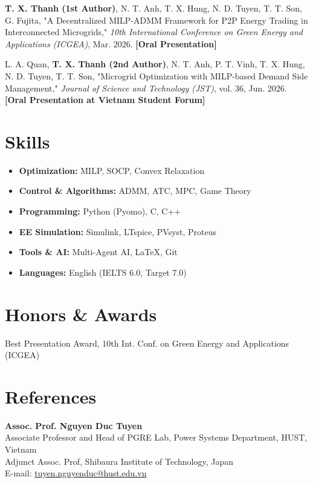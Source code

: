 \documentclass[11pt,letterpaper]{article}
\begin{document}
\begin{enumerate}[label={[\arabic*]}, leftmargin=0.25in, itemsep=0pt, topsep=0pt]
    \item \textbf{T. X. Thanh (1st Author)}, N. T. Anh, T. X. Hung, N. D. Tuyen, T. T. Son, G. Fujita, "A Decentralized MILP-ADMM Framework for P2P Energy Trading in Interconnected Microgrids," \textit{10th International Conference on Green Energy and Applications (ICGEA)}, Mar. 2026. \textbf{[Oral Presentation]}
    \item L. A. Quan, \textbf{T. X. Thanh (2nd Author)}, N. T. Anh, P. T. Vinh, T. X. Hung, N. D. Tuyen, T. T. Son, "Microgrid Optimization with MILP-based Demand Side Management," \textit{Journal of Science and Technology (JST)}, vol. 36, Jun. 2026. \textbf{[Oral Presentation at Vietnam Student Forum]}
\end{enumerate}

\vspace{1ex}

\section*{Skills}

\begin{itemize}[leftmargin=0in, label={}, labelsep=0pt, itemsep=0pt, topsep=0pt]
    \item \textbf{Optimization:} MILP, SOCP, Convex Relaxation
    \item \textbf{Control \& Algorithms:} ADMM, ATC, MPC, Game Theory
    \item \textbf{Programming:} Python (Pyomo), C, C++
    \item \textbf{EE Simulation:} Simulink, LTspice, PVsyst, Proteus
    \item \textbf{Tools \& AI:} Multi-Agent AI, LaTeX, Git
    \item \textbf{Languages:} English (IELTS 6.0, Target 7.0)
\end{itemize}

\vspace{1ex}

\section*{Honors \& Awards}

 \quad Best Presentation Award, 10th Int. Conf. on Green Energy and Applications (ICGEA)

\vspace{1ex}

\section*{References}

\noindent \textbf{Assoc. Prof. Nguyen Duc Tuyen} \\
\noindent Associate Professor and Head of PGRE Lab, Power Systems Department, HUST, Vietnam \\
\noindent Adjunct Assoc. Prof, Shibaura Institute of Technology, Japan \\
\noindent E-mail: \href{mailto:tuyen.nguyenduc@hust.edu.vn}{tuyen.nguyenduc@hust.edu.vn}
\end{document}
